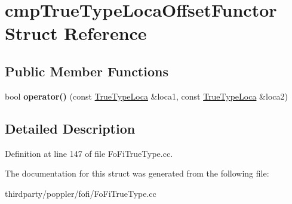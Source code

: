 \hypertarget{structcmp_true_type_loca_offset_functor}{}\section{cmp\+True\+Type\+Loca\+Offset\+Functor Struct Reference}
\label{structcmp_true_type_loca_offset_functor}
\subsection*{Public Member Functions}
\begin{DoxyCompactItemize}
\item 
\mbox{\label{structcmp_true_type_loca_offset_functor_a0304d7e03df86c3a4249f44b046e0d7f}} 
bool {\bfseries operator()} (const \hyperlink{struct_true_type_loca}{True\+Type\+Loca} \&loca1, const \hyperlink{struct_true_type_loca}{True\+Type\+Loca} \&loca2)
\end{DoxyCompactItemize}


\subsection{Detailed Description}


Definition at line 147 of file Fo\+Fi\+True\+Type.\+cc.



The documentation for this struct was generated from the following file\+:\begin{DoxyCompactItemize}
\item 
thirdparty/poppler/fofi/Fo\+Fi\+True\+Type.\+cc\end{DoxyCompactItemize}
